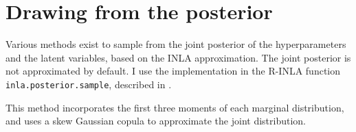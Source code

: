 \documentclass[thesis.tex]{subfiles}
\begin{document}
\section{Drawing from the posterior} \label{transmission:sec:INLA:posterior}

Various methods exist to sample from the joint posterior of the hyperparameters and the latent variables, based on the INLA approximation.
The joint posterior is not approximated by default.
I use the implementation in the R-INLA function \texttt{inla.posterior.sample}, described in \textcite[section 4]{chiuchioloJoint}.

This method incorporates the first three moments of each marginal distribution, and uses a skew Gaussian copula to approximate the joint distribution.
\end{document}
